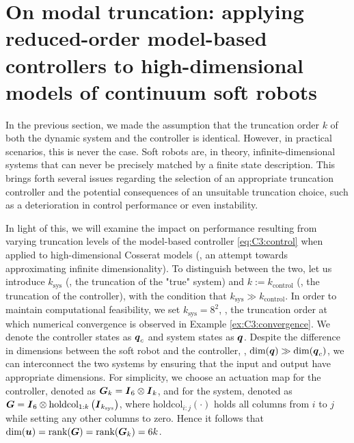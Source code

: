 \newpage
\section{On modal truncation: applying reduced-order model-based controllers to high-dimensional models of continuum soft robots}
In the previous section, we made the assumption that the truncation order $k$ of both the dynamic system and the controller is identical. However, in practical scenarios, this is never the case. Soft robots are, in theory, infinite-dimensional systems that can never be precisely matched by a finite state description. This brings forth several issues regarding the selection of an appropriate truncation controller and the potential consequences of an unsuitable truncation choice, such as a deterioration in control performance or even instability.
%

In light of this, we will examine the impact on performance resulting from varying truncation levels of the model-based controller \eqref{eq:C3:control} when applied to high-dimensional Cosserat models (\ie, an attempt towards approximating infinite dimensionality). To distinguish between the two, let us introduce $k_{\textrm{sys}}$ (\ie, the truncation of the "true" system) and $k:= k_{\textrm{control}}$ (\ie, the truncation of the controller), with the condition that $k_{\textrm{sys}} \gg k_{\textrm{control}}$. In order to maintain computational feasibility, we set $k_\textrm{sys} = 8^2$, \ie, the truncation order at which numerical convergence is observed in Example \ref{ex:C3:convergence}. We denote the controller states as ${\boldsymbol{q}}_c$ and system states as ${\boldsymbol{q}}$. Despite the difference in dimensions between the soft robot and the controller, \ie, $\text{dim}({\boldsymbol{q}}) \gg \text{dim}({\boldsymbol{q}}_c)$, we can interconnect the two systems by ensuring that the input and output have appropriate dimensions. For simplicity, we choose an actuation map for the controller, denoted as $\boldsymbol{G}_k = {\boldsymbol{I}}_6 \otimes {\boldsymbol{I}}_k$, and for the system, denoted as $\boldsymbol{G} = {\boldsymbol{I}}_6 \otimes \textrm{holdcol}_{1:k}\left( {\boldsymbol{I}}_{k_{\textrm{sys}}}\right)$, where $\textrm{holdcol}_{i:j}(\cdot)$ holds all columns from $i$ to $j$ while setting any other columns to zero. Hence it follows that $\text{dim}({\boldsymbol{u}}) = \textnormal{rank}({\boldsymbol{G}}) = \textnormal{rank}({\boldsymbol{G}}_k) = 6k$.

